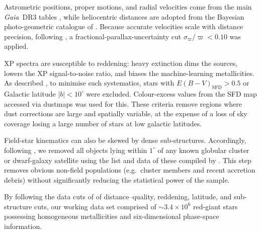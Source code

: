 \documentclass[a4paper,12pt]{article}
\begin{document}
Astrometric positions, proper motions, and radial velocities come from the main 
\textit{Gaia}~DR3 tables \citep{GaiaCollaboration2023}, while heliocentric 
distances are adopted from the Bayesian photo-geometric catalogue of 
\citet{BailerJones2021}.  
Because accurate velocities scale with distance precision, following \citet{zhang2024existencemetalpoordiscmilky},
a fractional-parallax-uncertainty cut $\sigma_{\varpi}/\varpi<0.10$ 
was applied.

XP spectra are susceptible to reddening: heavy extinction dims the sources, 
lowers the XP signal-to-noise ratio, and biases the machine-learning metallicities.  
As described \citet{zhang2024existencemetalpoordiscmilky}, to minimise 
such systematics, stars with $E(B{-}V)_{\mathrm{SFD}}>0.5$ or Galactic latitude 
$|b|<10^{\circ}$ were excluded. Colour-excess values from the SFD map accessed 
via dustmaps \citep{Green2018} was used for this.  
These criteria remove regions where dust corrections are large and spatially 
variable, at the expense of a loss of sky coverage losing a large number of stars 
at low galactic latitudes.

Field-star kinematics can also be skewed by dense sub-structures.  
Accordingly, following \citet{zhang2024existencemetalpoordiscmilky}, we removed 
all objects lying within $1^{\circ}$ of any known globular cluster or 
dwarf-galaxy satellite using the list and data of these compiled by 
\citet{Pace2024}.  
This step removes obvious non-field populations (e.g.\ cluster members and 
recent accretion debris) without significantly reducing the statistical power 
of the sample.

By following the data cuts of \citet{zhang2024existencemetalpoordiscmilky} of
distance–quality, reddening, latitude, and 
sub-structure cuts, our working data set comprised of $\sim3.4\times10^{6}$ 
red-giant stars possessing homogeneous metallicities and six-dimensional 
phase-space information.  
\end{document}
